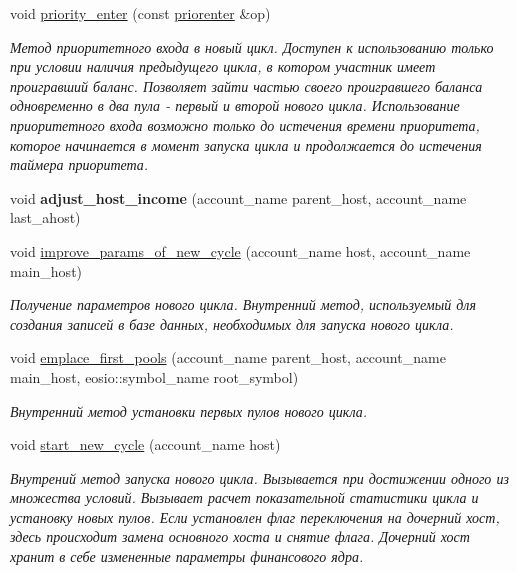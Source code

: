 \begin{DoxyCompactItemize}
void \mbox{\hyperlink{structeosio_1_1core_adf5822c41f9acc44534c06eb5d3e616b}{priority\+\_\+enter}} (const \mbox{\hyperlink{structeosio_1_1priorenter}{priorenter}} \&op)
\begin{DoxyCompactList}\small\item\em Метод приоритетного входа в новый цикл. Доступен к использованию только при условии наличия предыдущего цикла, в котором участник имеет проигравший баланс. Позволяет зайти частью своего проигравшего баланса одновременно в два пула -\/ первый и второй нового цикла. Использование приоритетного входа возможно только до истечения времени приоритета, которое начинается в момент запуска цикла и продолжается до истечения таймера приоритета. \end{DoxyCompactList}\item 
\mbox{\label{structeosio_1_1core_abdc36cbde13d6919274e1615cf72fecd}} 
void {\bfseries adjust\+\_\+host\+\_\+income} (account\+\_\+name parent\+\_\+host, account\+\_\+name last\+\_\+ahost)
\item 
void \mbox{\hyperlink{structeosio_1_1core_aa951318e432688f045d6893748a444cd}{improve\+\_\+params\+\_\+of\+\_\+new\+\_\+cycle}} (account\+\_\+name host, account\+\_\+name main\+\_\+host)
\begin{DoxyCompactList}\small\item\em Получение параметров нового цикла. Внутренний метод, используемый для создания записей в базе данных, необходимых для запуска нового цикла. \end{DoxyCompactList}\item 
void \mbox{\hyperlink{structeosio_1_1core_a1c8358af15c27c968b4879661242ee7a}{emplace\+\_\+first\+\_\+pools}} (account\+\_\+name parent\+\_\+host, account\+\_\+name main\+\_\+host, eosio\+::symbol\+\_\+name root\+\_\+symbol)
\begin{DoxyCompactList}\small\item\em Внутренний метод установки первых пулов нового цикла. \end{DoxyCompactList}\item 
void \mbox{\hyperlink{structeosio_1_1core_a0d8a3a33305dee1fc3cda981cacf009a}{start\+\_\+new\+\_\+cycle}} (account\+\_\+name host)
\begin{DoxyCompactList}\small\item\em Внутрений метод запуска нового цикла. Вызывается при достижении одного из множества условий. Вызывает расчет показательной статистики цикла и установку новых пулов. Если установлен флаг переключения на дочерний хост, здесь происходит замена основного хоста и снятие флага. Дочерний хост хранит в себе измененные параметры финансового ядра. \end{DoxyCompactList}\item 

\end{DoxyCompactItemize}
